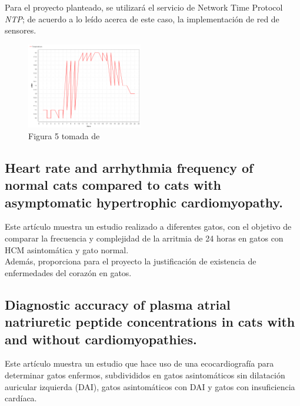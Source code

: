 \documentclass[letterpaper, 10 pt, conference]{ieeeconf}  %
\begin{document}
Para el proyecto planteado, se utilizar\'a el servicio de Network Time Protocol \textit{NTP}; de acuerdo a lo le\'ido acerca de este caso, la implementaci\'on de red de sensores.

\begin{figure}
\centering
\label{fig:uno}
\includegraphics[width=0.45\textwidth]{temperatura.png}
\caption{Figura 5 tomada de \cite{c1}}
\end{figure}


\subsection{Heart rate and arrhythmia frequency of normal cats compared to cats with asymptomatic hypertrophic cardiomyopathy. \cite{c2}}

Este art\'iculo muestra un estudio realizado a diferentes gatos, con el objetivo de comparar la frecuencia y complejidad de la arritmia de 24 horas en gatos con HCM asintom\'atica y gato normal.\\

Adem\'as, proporciona para el proyecto la justificaci\'on de existencia de enfermedades del coraz\'on en gatos.

\subsection{Diagnostic accuracy of plasma atrial natriuretic peptide concentrations in cats with and without cardiomyopathies. \cite{c3}}

Este art\'iculo muestra un estudio que hace uso de una ecocardiograf\'ia para determinar gatos enfermos, subdivididos en gatos asintom\'aticos sin dilataci\'on auricular izquierda (DAI), gatos asintom\'aticos con DAI y gatos con insuficiencia card\'iaca.\\ %
\end{document}
